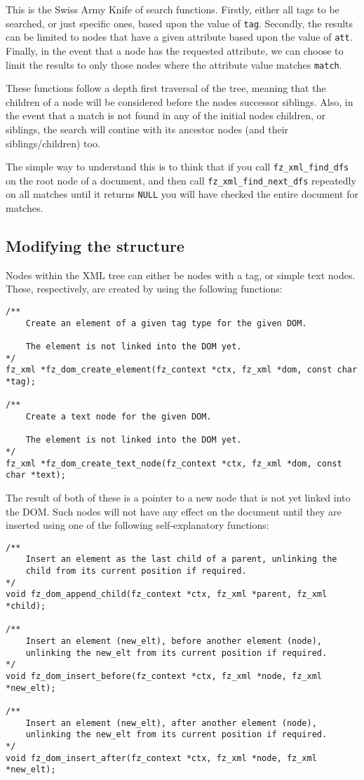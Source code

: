 \documentclass[oneside]{book}
\begin{document}
This is the Swiss Army Knife of search functions. Firstly, either all tags to be searched, or just specific ones, based upon the value of \texttt{tag}. Secondly, the results can be limited to nodes that have a given attribute based upon the value of \texttt{att}. Finally, in the event that a node has the requested attribute, we can choose to limit the results to only those nodes where the attribute value matches \texttt{match}.

These functions follow a depth first traversal of the tree, meaning that the children of a node will be considered before the nodes successor siblings. Also, in the event that a match is not found in any of the initial nodes children, or siblings, the search will contine with its ancestor nodes (and their siblings/children) too.

The simple way to understand this is to think that if you call \texttt{fz\_xml\_find\_dfs} on the root node of a document, and then
call \texttt{fz\_xml\_find\_next\_dfs} repeatedly on all matches until it returns \texttt{NULL} you will have checked the entire document for matches.

\subsection{Modifying the structure}

Nodes within the XML tree can either be nodes with a tag, or simple text nodes. These, respectively, are created by using the following functions:

\begin{lstlisting}
/**
	Create an element of a given tag type for the given DOM.

	The element is not linked into the DOM yet.
*/
fz_xml *fz_dom_create_element(fz_context *ctx, fz_xml *dom, const char *tag);

/**
	Create a text node for the given DOM.

	The element is not linked into the DOM yet.
*/
fz_xml *fz_dom_create_text_node(fz_context *ctx, fz_xml *dom, const char *text);
\end{lstlisting}

The result of both of these is a pointer to a new node that is not yet linked into the DOM. Such nodes will not have any effect on the document until they are inserted using one of the following self-explanatory functions:

\begin{lstlisting}
/**
	Insert an element as the last child of a parent, unlinking the
	child from its current position if required.
*/
void fz_dom_append_child(fz_context *ctx, fz_xml *parent, fz_xml *child);

/**
	Insert an element (new_elt), before another element (node),
	unlinking the new_elt from its current position if required.
*/
void fz_dom_insert_before(fz_context *ctx, fz_xml *node, fz_xml *new_elt);

/**
	Insert an element (new_elt), after another element (node),
	unlinking the new_elt from its current position if required.
*/
void fz_dom_insert_after(fz_context *ctx, fz_xml *node, fz_xml *new_elt);
\end{lstlisting}
\end{document}
